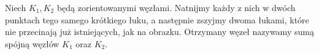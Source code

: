 \begin{definition}
    Niech $K_1, K_2$ będą zorientowanymi węzłami.
    Natnijmy każdy z nich w dwóch punktach tego samego krótkiego łuku, a następnie zszyjmy dwoma łukami, które nie przecinają już istniejących, jak na obrazku.
    Otrzymany węzeł nazywamy sumą spójną węzłów $K_1$ oraz $K_2$.

\end{definition}
